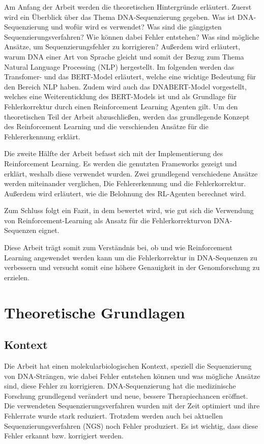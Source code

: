 \documentclass[oneside,bibliography=totocnumbered,BCOR=5mm]{scrbook}%
\theoremstyle{definition}
\theoremstyle{definition}
\theoremstyle{definition}
\theoremstyle{definition}
\theoremstyle{definition}
\theoremstyle{definition}
\begin{document}
Am Anfang der Arbeit werden die theoretischen Hintergründe erläutert. 
Zuerst wird ein Überblick über das Thema DNA-Sequenzierung gegeben.
Was ist DNA-Sequenzierung und wofür wird es verwendet?
Was sind die gängigsten Sequenzierungsverfahren?
Wie können dabei Fehler entstehen?
Was sind mögliche Ansätze, um Sequenzierungsfehler zu korrigieren?
Außerdem wird erläutert, warum DNA einer Art von Sprache gleicht und 
somit der Bezug zum Thema Natural Language Processing (NLP) hergestellt.
Im folgenden werden das Transfomer- und das BERT-Model erläutert, welche eine wichtige Bedeutung 
für den Bereich NLP haben.
Zudem wird auch das DNABERT-Model vorgestellt, welches eine Weiterenticklung des BERT-Models ist 
und als Grundlage für Fehlerkorrektur durch einen Reinforcement Learning Agenten gilt.
Um den theoretischen Teil der Arbeit abzuschließen, werden das grundlegende Konzept des 
Reinforcement Learning und die verschienden Ansätze für die Fehlererkennung erklärt.


Die zweite Hälfte der Arbeit befasst sich mit der Implementierung des Reinforcement Learning.
Es werden die genutzten Frameworks gezeigt und erklärt, weshalb diese verwendet wurden.
Zwei grundlegend verschiedene Ansätze werden miteinander verglichen, Die Fehlererkennung und die Fehlerkorrektur.
Außerdem wird erläutert, wie die Belohnung des RL-Agenten berechnet wird. 


Zum Schluss folgt ein Fazit, in dem bewertet wird, wie gut sich die Verwendung von Reinforcement-Learning 
als Ansatz für die Fehlerkorrekturvon DNA-Sequenzen eignet.


Diese Arbeit trägt somit zum Verständnis bei, ob und wie Reinforcement Learning angewendet werden kann um die Fehlerkorrektur in 
DNA-Sequenzen zu verbessern und versucht somit eine höhere Genauigkeit in der Genomforschung zu erzielen.


\chapter{Theoretische Grundlagen}

\section{Kontext}

Die Arbeit hat einen molekularbiologischen Kontext, speziell die Sequenzierung von DNA-Strängen, 
wie dabei Fehler entstehen können und was mögliche Ansätze sind, diese Fehler zu korrigieren.
DNA-Sequenzierung hat die medizinische Forschung grundlegend verändert und neue, bessere Therapiechancen eröffnet. 
Die verwendeten Sequenzierungsverfahren wurden mit der Zeit optimiert und ihre Fehlerrate wurde stark reduziert. 
Trotzdem werden auch bei aktuellen Sequenzierungsverfahren (NGS) noch Fehler produziert. 
Es ist wichtig, dass diese Fehler erkannt bzw. korrigiert werden.
\end{document}
